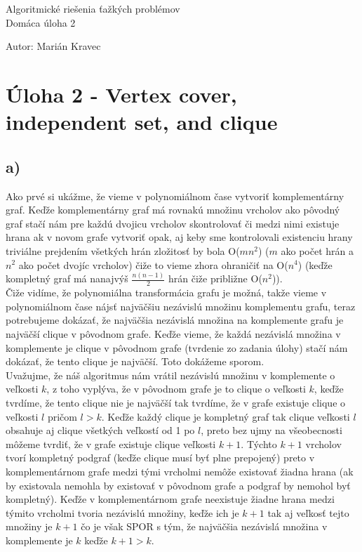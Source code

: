 \documentclass[a4paper]{article}
\begin{document}
 
	
\pagestyle{plain}

\begin{center}
	\sc\large
	Algoritmické riešenia ťažkých problémov\\
	Domáca úloha 2
\end{center}

Autor: Marián Kravec

\section{Úloha 2 - Vertex cover, independent set, and clique}

\subsection*{a)}

Ako prvé si ukážme, že vieme v polynomiálnom čase vytvoriť komplementárny graf. Keďže komplementárny graf má rovnakú množinu vrcholov ako pôvodný graf stačí nám pre každú dvojicu vrcholov skontrolovať či medzi nimi existuje hrana ak v novom grafe vytvoriť opak, aj keby sme kontrolovali existenciu hrany triviálne prejdením všetkých hrán zložitosť by bola O($m n^2$) ($m$ ako počet hrán a $n^2$ ako počet dvojíc vrcholov) čiže to vieme zhora ohraničiť na O($n^4$) (keďže kompletný graf má nanajvýš $\frac{n(n-1)}{2}$ hrán čiže približne O($n^2$)). 
\\

Čiže vidíme, že polynomiálna transformácia grafu je možná, takže vieme v polynomiálnom čase nájsť najväčšiu nezávislú množinu komplementu grafu, teraz potrebujeme dokázať, že najväčšia nezávislá množina na komplemente grafu je najväčší clique v pôvodnom grafe. Keďže vieme, že každá nezávislá množina v komplemente je clique v pôvodnom grafe (tvrdenie zo zadania úlohy) stačí nám dokázať, že tento clique je najväčší. Toto dokážeme sporom.
\\

Uvažujme, že náš algoritmus nám vrátil nezávislú množinu v komplemente o veľkosti $k$, z toho vyplýva, že v pôvodnom grafe je to clique o veľkosti $k$, keďže tvrdíme, že tento clique nie je najväčší tak tvrdíme, že v grafe existuje clique o veľkosti $l$ pričom $l > k$. Keďže každý clique je kompletný graf tak clique veľkosti $l$ obsahuje aj clique všetkých veľkostí od 1 po $l$, preto bez ujmy na všeobecnosti môžeme tvrdiť, že v grafe existuje clique veľkosti $k+1$. Týchto $k+1$ vrcholov tvorí kompletný podgraf (keďže clique musí byť plne prepojený) preto v komplementárnom grafe medzi tými vrcholmi nemôže existovať žiadna hrana (ak by existovala nemohla by existovať v pôvodnom grafe a podgraf by nemohol byť kompletný). Keďže v komplementárnom grafe neexistuje žiadne hrana medzi týmito vrcholmi tvoria nezávislú množiny, keďže ich je $k+1$ tak aj veľkosť tejto množiny je $k+1$ čo je však SPOR s tým, že najväčšia nezávislá množina v komplemente je $k$ keďže $k+1>k$. 
\end{document}
